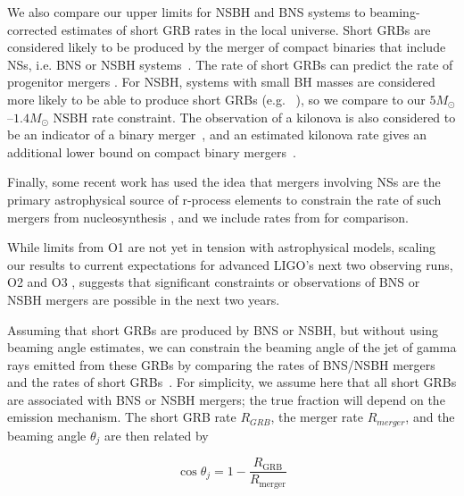 We also compare our upper limits for \ac{NSBH} and \ac{BNS} systems to beaming-corrected
estimates of short \ac{GRB} rates in the local universe. Short \acp{GRB} are
considered likely to be produced by the merger of compact
binaries that include \acp{NS}, i.e. \ac{BNS} or \ac{NSBH}
systems~\citep{Berger:2013jza}. The rate of short \acp{GRB} can
predict the rate of progenitor mergers %
\citep{Coward:2012gn,Petrillo:2012ij,Siellez:2013hia,Fong:2015oha}.
For \ac{NSBH}, systems with small \ac{BH} masses are considered more likely to be able to
produce short \acp{GRB} (e.g.~ \citep{Duez:2009yz,Giacomazzo:2012zt,Pannarale:2015jia}), so we compare to our
$5 M_{\odot}$--$1.4 M_{\odot}$
\ac{NSBH} rate constraint. The observation of a kilonova is also considered to be an
indicator of a binary merger~\citep{Metzger:2011bv}, and an estimated kilonova rate
gives an additional lower bound on compact binary mergers~\citep{Jin:2015txa}.

Finally, some recent work has used the idea that mergers involving \acp{NS}
are the primary astrophysical source of r-process
elements \citep{1974ApJ...192L.145L,Qian:2007vq} to constrain the rate of such
mergers from nucleosynthesis \citep{Bauswein:2014vfa,Vangioni:2015ofa}, and we
include rates from \citep{Vangioni:2015ofa} for comparison.

While limits from \ac{O1} are not yet in tension with astrophysical models, scaling
our results to current expectations for advanced \ac{LIGO}'s next two observing runs,
O2 and O3 \citep{Aasi:2013wya}, suggests that significant constraints or
observations of \ac{BNS} or \ac{NSBH} mergers are possible in the next two years.

Assuming that short \acp{GRB} are produced by \ac{BNS} or \ac{NSBH}, but
without using beaming angle estimates, we can constrain the beaming angle of the jet
of gamma rays emitted from these \acp{GRB} by comparing the rates of
\ac{BNS}/\ac{NSBH} mergers and the rates of
short \acp{GRB}~\citep{Chen:2012qh}.
For simplicity, we assume here that all short \acp{GRB} are associated with \ac{BNS}
or \ac{NSBH} mergers; the true fraction will
depend on the emission mechanism.  The short \ac{GRB} rate $R_{GRB}$, the merger rate
$R_{merger}$, and the beaming angle $\theta_j$ are then related by
%
\begin{linenomath*}
\begin{equation}\label{eq:beaming}
\cos \theta_j = 1 - \frac{R_{\mathrm{GRB}}}{R_{\mathrm{merger}}}
\end{equation}
\end{linenomath*}

